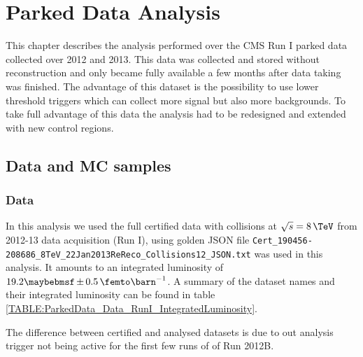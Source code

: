\chapter{Parked Data Analysis}
\label{CHAPTER:ParkedDataAnalysis}

\glsresetall %

This chapter describes the analysis performed over the \gls{CMS} Run I parked data collected over 2012 and 2013. This data was collected and stored without reconstruction and only became fully available a few months after data taking was finished. The advantage of this dataset is the possibility to use lower threshold triggers which can collect more signal but also more backgrounds. To take full advantage of this data the analysis had to be redesigned and extended with new control regions.


\section{Data and MC samples}

\subsection{Data}

In this analysis we used the full certified data with collisions at $\sqrt{s}=8\,\TeV$ from 2012-13 data acquisition (Run I), using golden JSON file \verb|Cert_190456-208686_8TeV_22Jan2013ReReco_Collisions12_JSON.txt| was used in this analysis. It amounts to an integrated luminosity of $19.2 \pm 0.5 \,\femto\barn^{-1}$. A summary of the dataset names and their integrated luminosity can be found in table \ref{TABLE:ParkedData_Data_RunI_IntegratedLuminosity}.



The difference between certified and analysed datasets is due to out analysis trigger not being active for the first few runs of of Run 2012B. 

